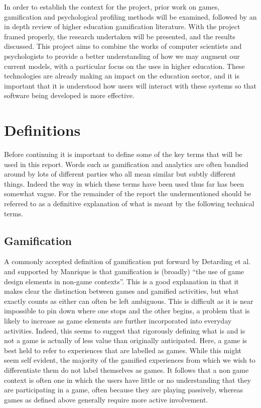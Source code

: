 \documentclass[12pt,a4paper,twoside]{report}
\begin{document}
In order to establish the context for the project, prior work on games, gamification and psychological profiling methods will be examined, followed by an in depth review of higher education gamification literature. With the project framed properly, the research undertaken will be presented, and the results discussed. This project aims to combine the works of computer scientists and psychologists to provide a better understanding of how we may augment our current models, with a particular focus on the uses in higher education. These technologies are already making an impact on the education sector, and it is important that it is understood how users will interact with these systems so that software being developed is more effective.

\chapter{Definitions}
\label{sec:define}
Before continuing it is important to define some of the key terms that will be used in this report. Words such as gamification and analytics are often bandied around by lots of different parties who all mean similar but subtly different things. Indeed the way in which these terms have been used thus far has been somewhat vague. For the remainder of the report the undermentioned should be referred to as a definitive explanation of what is meant by the following technical terms.

\section{Gamification}
A commonly accepted definition of gamification put forward by Detarding et al. \cite{deterding2011game} and supported by Manrique \cite{iversitymooc} is that gamification is (broadly) ``the use of game design elements in non-game contexts''. This is a good explanation in that it makes clear the distinction between games and gamified activities, but what exactly counts as either can often be left ambiguous. This is difficult as it is near impossible to pin down where one stops and the other begins, a problem that is likely to increase as game elements are further incorporated into everyday activities. Indeed, this seems to suggest that rigorously defining what is and is not a game is actually of less value than originally anticipated. Here, a game is best held to refer to experiences that are labelled as games. While this might seem self evident, the majority of the gamified experiences from which we wish to differentiate them do not label themselves as games. It follows that a non game context is often one in which the users have little or no understanding that they are participating in a game, often because they are playing passively, whereas games as defined above generally require more active involvement.
\end{document}
